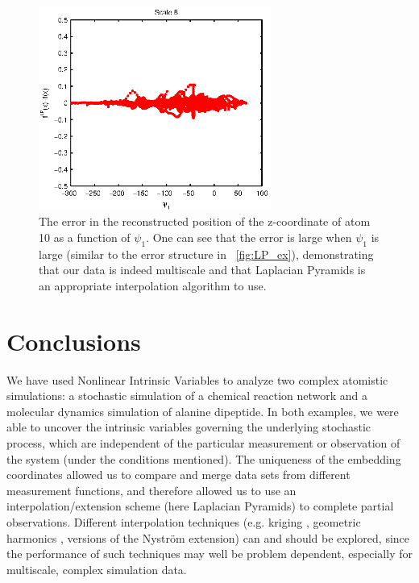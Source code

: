 \begin{figure}[t]
    \centering
    \includegraphics[width=3in]{fig10b}
    \caption[Error in selected coordinate of reconstructed alanine dipeptide configurations]{The error in the reconstructed position of the z-coordinate of atom 10 as a function of $\psi_1$. One can see that the error is large when $\psi_1$ is large (similar to the error structure in \fig~\ref{fig:LP_ex}), demonstrating that our data is indeed multiscale and that Laplacian Pyramids is an appropriate interpolation algorithm to use.}
    \label{fig:LapPyr_ala2_errors}
\end{figure}

\section{Conclusions} \label{sec:conclusions}
%
We have used Nonlinear Intrinsic Variables to analyze two complex atomistic simulations: a stochastic simulation of a chemical reaction network and a molecular dynamics simulation of alanine dipeptide.
%
In both examples, we were able to uncover the intrinsic variables governing the underlying stochastic process, which are independent
of the particular measurement or observation  of the system (under the conditions mentioned).
%
The uniqueness of the embedding coordinates allowed us to compare and merge data sets from different measurement functions,
and therefore allowed us to use an interpolation/extension scheme (here Laplacian Pyramids) to complete partial observations.
%
Different interpolation techniques (e.g. kriging \cite{matheron1963principles, matheron1973intrinsic}, geometric harmonics \cite{coifman2006geometric},  versions of the Nystr\"{o}m extension) can and should
be explored, since the performance of such techniques may well be problem dependent, especially for multiscale, complex simulation data.

